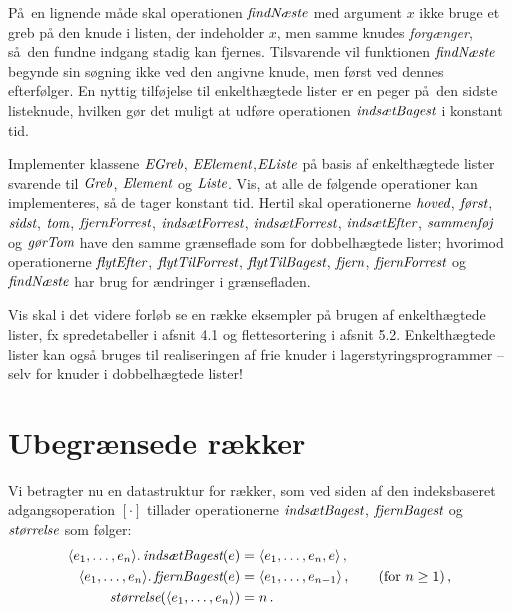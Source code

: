 På en lignende måde skal operationen $\operatorname{\emph{findNæste}}$ med argument $x$ ikke bruge et greb på den knude i listen, der indeholder $x$, men samme knudes \emph{forgænger}, så den fundne indgang stadig kan fjernes.
Tilsvarende vil funktionen $\operatorname{\emph{findNæste}}$ begynde sin søgning ikke ved den angivne knude, men først ved dennes efterfølger.
En nyttig tilføjelse til enkelthægtede lister er en peger på den sidste listeknude, hvilken gør det muligt at udføre operationen $\operatorname{\emph{indsætBagest}}$ i konstant tid.

\begin{exerc}
  Implementer klassene $\operatorname{\emph{EGreb}}$, $\operatorname{\emph{EElement}}$,$\operatorname{\emph{EListe}}$ på basis af enkelthægtede lister svarende til
  $\operatorname{\emph{Greb}}$, $\operatorname{\emph{Element}}$ og $\operatorname{\emph{Liste}}$.
  Vis, at alle de følgende operationer kan implementeres, så de tager konstant tid.
  Hertil skal operationerne $\operatorname{\emph{hoved}}$, $\operatorname{\emph{først}}$, $\operatorname{\emph{sidst}}$, $\operatorname{\emph{tom}}$, $\operatorname{\emph{fjernForrest}}$, $\operatorname{\emph{indsætForrest}}$, $\operatorname{\emph{indsætForrest}}$, $\operatorname{\emph{indsætEfter}}$, $\operatorname{\emph{sammenføj}}$ og $\operatorname{\emph{gørTom}}$ have den samme grænseflade som for dobbelhægtede lister;
  hvorimod operationerne $\operatorname{\emph{flytEfter}}$, $\operatorname{\emph{flytTilForrest}}$, $\operatorname{\emph{flytTilBagest}}$, $\operatorname{\emph{fjern}}$, $\operatorname{\emph{fjernForrest}}$ og $\operatorname{\emph{findNæste}}$ har brug for ændringer i grænsefladen.
\end{exerc}

Vis skal i det videre forløb se en række eksempler på brugen af enkelthægtede lister, fx spredetabeller i afsnit 4.1 og flettesortering i afsnit 5.2.
Enkelthægtede lister kan også bruges til realiseringen af frie knuder i  lagerstyringsprogrammer -- selv for knuder i dobbelhægtede lister!

\section{Ubegrænsede rækker}

Vi betragter nu en datastruktur for rækker, som ved siden af den indeksbaseret adgangsoperation $[\cdot]$ tillader operationerne $\operatorname{\emph{indsætBagest}}$, $\operatorname{\emph{fjernBagest}}$ og $\operatorname{\emph{størrelse}}$ som følger:
\begin{align*}
  \langle e_1,\ldots, e_n\rangle.\operatorname{\emph{indsætBagest}}(e) &=
\langle e_1,\ldots, e_n, e\rangle\,,\\
  \langle e_1,\ldots, e_n\rangle.\operatorname{\emph{fjernBagest}}(e) &=
  \langle e_1,\ldots, e_{n-1}\rangle\,, \qquad (\text{for } n\geq 1)\,,\\
  \operatorname{\emph{størrelse}}(\langle e_1,\ldots, e_n\rangle) &= n\,.
\end{align*}

